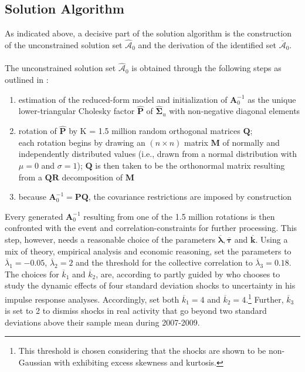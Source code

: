 \documentclass[a4paper,11pt,listof=nochaptergap,oneside,pointednumbers,bibtotoc,bigheadings,liststotoc]{scrbook}
\theoremstyle{mysatz}
\theoremstyle{mydefinition}
\theoremstyle{mytheorem}
\theoremstyle{mybemerkung}
\let\oldhat\hat
\newcommand{\vect}[1]{\boldsymbol{\mathbf{#1}}}
\newcommand{\hatt}[1]{\oldhat{\boldsymbol{\mathbf{#1}}}}
\begin{document}
\subsection{Solution Algorithm}
\label{sec:solutionAlgorithm}
As indicated above, a decisive part of the solution algorithm is the construction of the unconstrained solution set $\hatt{\mathcal{A}}_0$ and the derivation of the identified set $\overline{\vect{\mathcal{A}}}_0$. \\
\\
The unconstrained solution set $\hatt{\mathcal{A}}_0$ is obtained through the following steps as outlined in \citet{ludvigsonetal:18}:
\begin{enumerate}[i]
	\item estimation of the reduced-form model and initialization of $\vect{A}_0^{-1}$ as the unique lower-triangular Cholesky factor $\hatt{\vect{P}}$ of $\hatt{\vect{\Sigma}}_u$ with non-negative diagonal elements
	\item rotation of $\hatt{\vect{P}}$ by K = 1.5 million random orthogonal matrices $\vect{Q}$;\\
	 each rotation begins by drawing an $(n \times n)$ matrix $\vect{M}$ of normally and independently distributed values (i.e., drawn from a normal distribution with $\mu = 0$ and $\sigma = 1$); $\vect{Q}$ is then taken to be the orthonormal matrix resulting from a $\vect{Q}\vect{R}$ decomposition of $\vect{M}$
	 \item because $\vect{A}_0^{-1} = \vect{P}\vect{Q}$, the covariance restrictions are imposed by construction 
\end{enumerate}

Every generated $\vect{A}_0^{-1}$ resulting from one of the 1.5 million rotations is then confronted with the event and correlation-constraints for further processing. This step, however, needs a reasonable choice of the parameters $\overline{\vect{\lambda}}, \overline{\vect{\tau}}$ and $\overline{\vect{k}}$. Using a mix of theory, empirical analysis and economic reasoning, \citet{ludvigsonetal:18} set the parameters to  $\overline{\lambda}_1 = -0.05$, $\overline{\lambda}_2 = 2$ and the threshold for the collective correlation to $\overline{\lambda}_3 = 0.18$. The choices for $\overline{k}_1$ and $\overline{k}_2$, are, according to \citet{ludvigsonetal:18} partly guided by \citet{bloom:09} who chooses to study the dynamic effects of four standard deviation shocks to uncertainty in his impulse response analyses. Accordingly, \citet{ludvigsonetal:18} set both $\overline{k}_1 = 4$ and $\overline{k}_2 = 4$.\footnote{This threshold is chosen considering that the shocks are shown to be non-Gaussian with exhibiting excess skewness and kurtosis.} Further, $\overline{k}_3$ is set to 2 to dismiss shocks in real activity that go beyond two standard deviations above their sample mean during 2007-2009.
\end{document}
